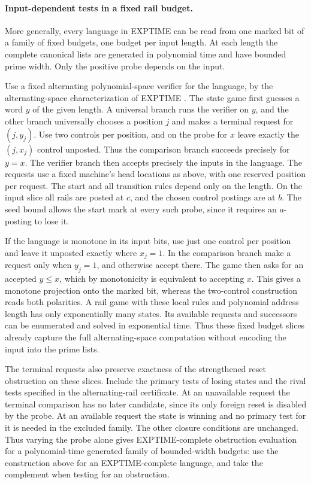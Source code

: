 \paragraph{Input-dependent tests in a fixed rail budget.}
More generally, every language in EXPTIME can be
read from one marked bit of a family of fixed
budgets, one budget per input length. At each
length the complete canonical lists are generated
in polynomial time and have bounded prime width.
Only the positive probe depends on the input.

Use a fixed alternating polynomial-space verifier
for the language, by the alternating-space
characterization of EXPTIME
\cite{ChandraKozenStockmeyer1981}. The state
game first guesses a word $y$ of the given
length. A universal branch runs the verifier
on $y$, and the other branch universally
chooses a position $j$ and makes a terminal
request for $(j,y_j)$. Use two controls per
position, and on the probe for $x$ leave exactly
the $(j,x_j)$ control unposted. Thus the
comparison branch succeeds precisely for
$y=x$. The verifier branch then accepts
precisely the inputs in the language. The
requests use a fixed machine's head locations
as above, with one reserved position per
request. The start and all transition rules
depend only on the length. On the input slice
all rails are posted at $c$, and the chosen
control postings are at $b$. The seed bound
allows the start mark at every such probe,
since it requires an $a$-posting to lose it.

If the language is monotone in its input
bits, use just one control per position and
leave it unposted exactly where $x_j=1$.
In the comparison branch make a request
only when $y_j=1$, and otherwise accept
there. The game then asks for an accepted
$y\le x$, which by monotonicity is equivalent
to accepting $x$. This gives a monotone
projection onto the marked bit, whereas
the two-control construction reads both
polarities. A rail game with these local rules and
polynomial address length has only exponentially
many states. Its available requests and
successors can be enumerated and solved
in exponential time. Thus these fixed
budget slices already capture the full
alternating-space computation without
encoding the input into the prime lists.

The terminal requests also preserve exactness of
the strengthened reset obstruction on these slices.
Include the primary tests of losing states and the
rival tests specified in the alternating-rail
certificate. At an unavailable request the terminal
comparison has no later candidate, since its only
foreign reset is disabled by the probe. At an
available request the state is winning and no
primary test for it is needed in the excluded
family. The other closure conditions are unchanged.
Thus varying the probe alone gives EXPTIME-complete
obstruction evaluation for a polynomial-time
generated family of bounded-width budgets: use
the construction above for an EXPTIME-complete
language, and take the complement when testing
for an obstruction.

